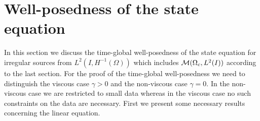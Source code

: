\section{Well-posedness of the state equation}\label{secwellposedness}
In this section we discuss the time-global well-posedness of the state equation for irregular sources from $L^2(I,H^{-1}(\Omega))$ which includes $\mathcal{M}(\Omega_c, L^{2}(I))$ according to the last section. {\color{red} For the proof of the time-global well-posedness we need to distinguish the viscous case $\gamma>0$ and the non-viscous case $\gamma=0$. In the non-viscous case we are restricted to small data whereas in the viscous case no such constraints on the data are necessary.} First we present some necessary results concerning the linear \KdVB equation.
